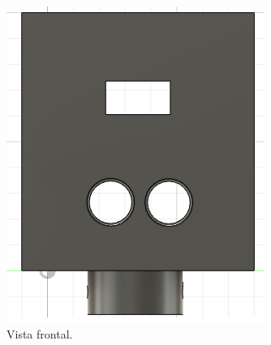 \begin{figure}[bth]
\begin{subfigure}{.35\textwidth}
        \includegraphics[width=\textwidth
        ]{imgs/vistas-contenedor/frontal.png}
        \caption{Vista frontal.}
        \label{fig:contenedor-frontal}
    \end{subfigure}
    \begin{subfigure}{.35\textwidth}
        \centering

\end{subfigure}
\end{figure}
